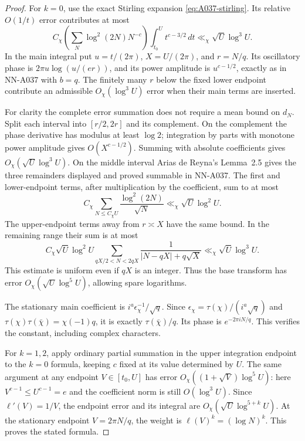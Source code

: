 \begin{proof}
For \(k=0\), use the exact Stirling expansion
\eqref{eq:A037-stirling}. Its relative \(O(1/t)\) error
contributes at most
\[
 C_\chi\left(\sum_N\log^2(2N)N^{-c}\right)
                    \int_{t_0}^{U}t^{c-3/2}\,dt
                         \ll_\chi\sqrt U\log^3 U.
\]
In the main integral put \(u=t/(2\pi)\), \(X=U/(2\pi)\),
and \(r=N/q\). Its oscillatory phase is
\(2\pi u\log(u/(er))\), and its power amplitude is
\(u^{c-1/2}\), exactly as in NN-A037 with \(b=q\).
The finitely many \(r\) below the fixed lower endpoint
contribute an admissible \(O_\chi(\log^3U)\) error when
their main terms are inserted.

For clarity the complete error summation does not require a
mean bound on \(d_N\). Split each interval into
\([r/2,2r]\) and its complement. On the complement the
phase derivative has modulus at least \(\log2\);
integration by parts with monotone power amplitude gives
\(O(X^{c-1/2})\). Summing with absolute coefficients gives
\(O_\chi(\sqrt U\log^3U)\).
On the middle interval Arias de Reyna's Lemma~2.5 gives the
three remainders displayed and proved summable in NN-A037.
The first and lower-endpoint terms, after multiplication
by the coefficient, sum to at most
\[
                    C_\chi\sum_{N\le C_\chi U}
                             \frac{\log^2(2N)}{\sqrt N}
                         \ll_\chi\sqrt U\log^2 U.
\]
The upper-endpoint terms away from \(r\asymp X\) have the
same bound. In the remaining range their sum is at most
\[
 C_\chi\sqrt U\log^2U
       \sum_{qX/2<N<2qX}
                   \frac1{|N-qX|+q\sqrt X}
                        \ll_\chi\sqrt U\log^3U.
\]
This estimate is uniform even if \(qX\) is an integer.
Thus the base transform has error
\(O_\chi(\sqrt U\log^5U)\), allowing spare logarithms.

The stationary main coefficient is
 \(i^a\epsilon_\chi^{-1}/\sqrt q\).
Since \(\epsilon_\chi=\tau(\chi)/(i^a\sqrt q)\) and
\(\tau(\chi)\tau(\bar\chi)=\chi(-1)q\), it is exactly
\(\tau(\bar\chi)/q\). Its phase is \(e^{-2\pi iN/q}\).
This verifies the constant, including complex characters.

For \(k=1,2\), apply ordinary partial summation in the upper
integration endpoint to the \(k=0\) formula, keeping \(c\)
fixed at its value determined by \(U\).
The same argument at any endpoint \(V\in[t_0,U]\) has
error \(O_\chi((1+\sqrt V)\log^5U)\): here
\(V^{c-1}\le U^{c-1}=e\) and the coefficient norm is still
\(O(\log^3U)\).
Since \(\ell'(V)=1/V\), the endpoint error and its
integral are \(O_\chi(\sqrt U\log^{5+k}U)\).
At the stationary endpoint \(V=2\pi N/q\), the weight is
\(\ell(V)^k=(\log N)^k\). This proves the stated formula.
\end{proof}

